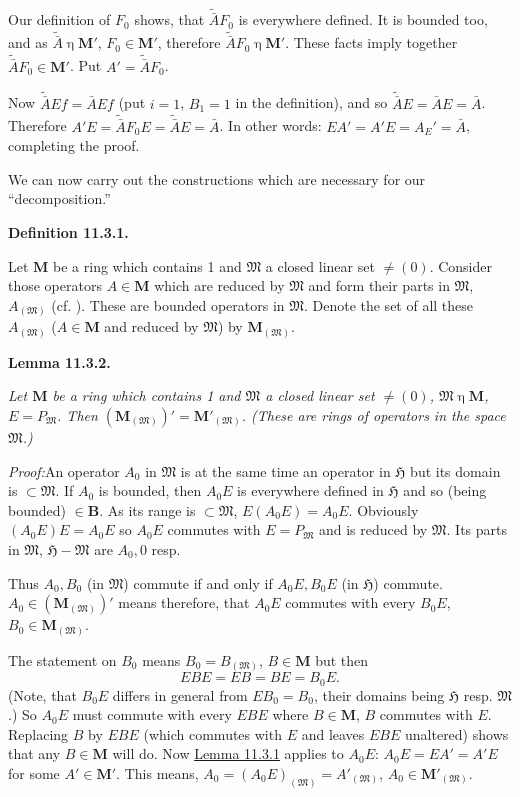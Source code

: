 \documentclass[12pt,b5paper,twoside]{article}
\newcommand{\Hspace}{\mathfrak H}
\newcommand{\M}{\mathbf M}
\newcommand{\B}{\mathbf B}
\newcommand{\Definition}[1]{%
  \par\smallskip\noindent\phantomsection\label{def:#1}\textbf{Definition #1.}\enspace
}
\newcommand{\Lemma}[1]{%
  \par\smallskip\noindent\phantomsection\label{lem:#1}\textbf{Lemma #1.}\enspace
}
\newcommand{\Proof}{\par\noindent\textit{Proof:}\enspace}
\newcommand{\lemref}[1]{\hyperref[lem:#1]{Lemma #1}}
\begin{document}
Our definition of $F_0$ shows, that $\widetilde{\bar A}F_0$ is everywhere
defined. It is bounded too, and as
$\widetilde{\bar A}\mathbin\eta\M'$, $F_0\in\M'$, therefore
$\widetilde{\bar A}F_0\mathbin\eta\M'$. These facts imply together
$\widetilde{\bar A}F_0\in\M'$. Put
$A'=\widetilde{\bar A}F_0$.

Now $\widetilde{\bar A}Ef=\bar AEf$ (put $i=1$, $B_1=1$ in the
definition), and so $\widetilde{\bar A}E=\bar AE=\bar A$. Therefore
$A'E=\widetilde{\bar A}F_0E=\widetilde{\bar A}E=\bar A$. In other words:
$EA'=A'E=A_E'=\bar A$, completing the proof.

We can now carry out the constructions which are necessary for our
``decomposition.''

\Definition{11.3.1}
Let $\M$ be a ring which contains 1 and $\mathfrak M$ a closed linear set
$\ne(0)$. Consider those operators $A\in\M$ which are reduced by
$\mathfrak M$ and form their parts in $\mathfrak M$, $A_{(\mathfrak M)}$
(cf. \cite[p.~78]{ref16}). These are bounded operators in $\mathfrak M$.
Denote the set of all these $A_{(\mathfrak M)}$ ($A\in\M$ and reduced by
$\mathfrak M$) by $\M_{(\mathfrak M)}$.

\Lemma{11.3.2}
{\itshape
Let $\M$ be a ring which contains 1 and $\mathfrak M$ a closed linear set
$\ne(0)$, $\mathfrak M\mathbin\eta\M$, $E=P_{\mathfrak M}$. Then
$(\M_{(\mathfrak M)})'=\M'_{(\mathfrak M)}$. (These are rings of
operators in the space $\mathfrak M$.)}

\Proof An operator $A_0$ in $\mathfrak M$ is at the same time an operator
in $\Hspace$ but its domain is $\subset\mathfrak M$. If $A_0$ is bounded,
then $A_0E$ is everywhere defined in $\Hspace$ and so (being bounded)
$\in\B$. As its range is $\subset\mathfrak M$,
$E(A_0E)=A_0E$. Obviously $(A_0E)E=A_0E$ so $A_0E$ commutes with
$E=P_{\mathfrak M}$ and is reduced by $\mathfrak M$. Its parts in
 $\mathfrak M$, $\Hspace-\mathfrak M$ are $A_0,0$ resp.

Thus $A_0,B_0$ (in $\mathfrak M$) commute if and only if $A_0E,B_0E$ (in
$\Hspace$) commute. $A_0\in(\M_{(\mathfrak M)})'$ means therefore, that
$A_0E$ commutes with every $B_0E$, $B_0\in\M_{(\mathfrak M)}$.

The statement on $B_0$ means $B_0=B_{(\mathfrak M)}$, $B\in\M$ but then
\[
 EBE=EB=BE=B_0E.
\]
(Note, that $B_0E$ differs in general from $EB_0=B_0$, their domains being
 $\Hspace$ resp. $\mathfrak M$.) So $A_0E$ must commute with every
$EBE$ where $B\in\M$, $B$ commutes with $E$. Replacing $B$ by $EBE$
(which commutes with $E$ and leaves $EBE$ unaltered) shows that any
$B\in\M$ will do. Now \lemref{11.3.1} applies to $A_0E$:
$A_0E=EA'=A'E$ for some $A'\in\M'$. This means,
$A_0=(A_0E)_{(\mathfrak M)}=A'_{(\mathfrak M)}$,
$A_0\in\M'_{(\mathfrak M)}$.
\end{document}
